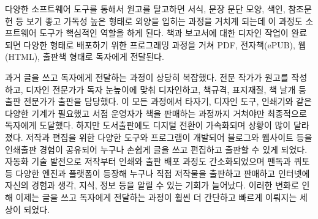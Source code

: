 \documentclass[
  letterpaper,
]{book}
\begin{document}
다양한 소프트웨어 도구를 통해서 원고를 탈고하면 서식, 문장 문단 모양,
색인, 참조문헌 등 보기 좋고 가독성 높은 형태로 외양을 입히는 과정을
거치게 되는데 이 과정도 소프트웨어 도구가 핵심적인 역할을 하게 된다.
책과 보고서에 대한 디자인 작업이 완료되면 다양한 형태로 배포하기 위한
프로그래밍 과정을 거쳐 PDF, 전자책(ePUB), 웹(HTML), 출판책 형태로
독자에게 전달된다.

과거 글을 쓰고 독자에게 전달하는 과정이 상당히 복잡했다. 전문 작가가
원고를 작성하고, 디자인 전문가가 독자 눈높이에 맞춰 디자인하고, 책규격,
표지재질, 책 날개 등 출판 전문가가 출판을 담당했다. 이 모든 과정에서
타자기, 디자인 도구, 인쇄기와 같은 다양한 기계가 필요했고 서점 운영자가
책을 판매하는 과정까지 거쳐야만 최종적으로 독자에게 도달했다. 하지만
도서출판에도 디지털 전환이 가속화되며 상황이 많이 달라졌다. 저작과
편집을 위한 다양한 도구와 프로그램이 개발되어 블로그와 웹사이트 등을
인쇄출판 경험이 공유되어 누구나 손쉽게 글을 쓰고 편집하고 출판할 수 있게
되었다. 자동화 기술 발전으로 저작부터 인쇄와 출판 배포 과정도
간소화되었으며 팬독과 쿼토 등 다양한 엔진과 플랫폼이 등장해 누구나 직접
저작물을 출판하고 판매하고 인터넷에 자신의 경험과 생각, 지식, 정보 등을
알릴 수 있는 기회가 늘어났다. 이러한 변화로 인해 이제는 글을 쓰고
독자에게 전달하는 과정이 훨씬 더 간단하고 빠르게 이뤄지는 세상이 되었다.
\end{document}
